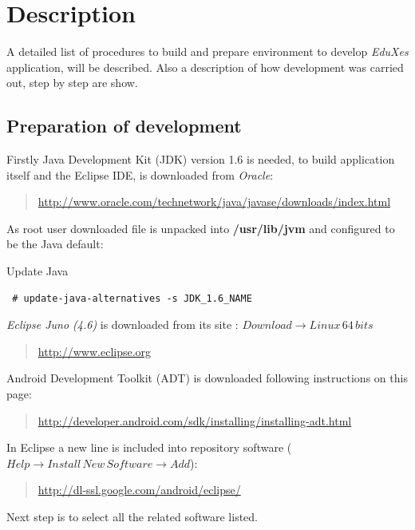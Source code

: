 \chapter{Description}
 
 A detailed list of procedures to build and prepare environment to develop \emph{EduXes} application, will be described.
 Also a description of how development was carried out, step by step are show.
 

\section{Preparation of development}
Firstly Java Development Kit (JDK) version 1.6 is needed, to build application itself and the Eclipse IDE, is downloaded from \emph{Oracle}: 
\cite{JavaSE}
\begin{quote}
\url{http://www.oracle.com/technetwork/java/javase/downloads/index.html}
\end{quote}

As root user downloaded file is unpacked into {\bf /usr/lib/jvm } and configured to be the Java default:
\begin{bclogo}[couleur=red!30,arrondi=0.1, logo=\bcpanchant,  ombre=true ] 
{Update Java}   
\begin{verbatim}
 # update-java-alternatives -s JDK_1.6_NAME
\end{verbatim}
\end{bclogo}

	\emph{Eclipse Juno (4.6)} is downloaded from its site \cite{Eclipse}: $Download \rightarrow Linux \, 64\, bits$
\begin{quote}
\url{http://www.eclipse.org}
\end{quote}
Android Development Toolkit (ADT)\cite{AndroidDevelopmentKit} is downloaded following instructions on this page:
\begin{quote}
\url{http://developer.android.com/sdk/installing/installing-adt.html}
\end{quote}

	In Eclipse a new line is included into repository software ($Help \rightarrow  Install\, New\, Software \rightarrow Add$):
\begin{quote}
\url{http://dl-ssl.google.com/android/eclipse/}
\end{quote}
	Next step is to select all the related software listed.
	
